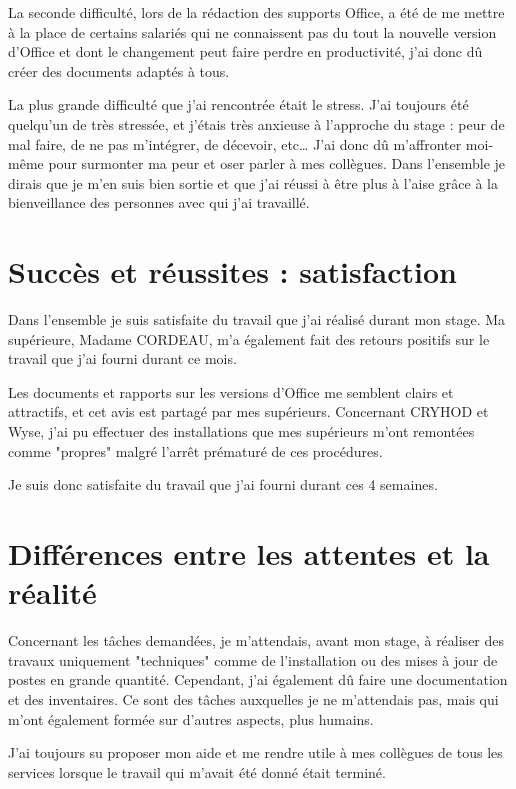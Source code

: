 La seconde difficulté, lors de la rédaction des supports Office, a été de me mettre à la place de certains salariés qui ne connaissent pas du tout la nouvelle version d’Office et dont le changement peut faire perdre en productivité, j’ai donc dû créer des documents adaptés à tous.

La plus grande difficulté que j’ai rencontrée était le stress. J’ai toujours été quelqu’un de très stressée, et j’étais très anxieuse à l’approche du stage : peur de mal faire, de ne pas m’intégrer, de décevoir, etc\dots
J’ai donc dû m’affronter moi-même pour surmonter ma peur et oser parler à mes collègues. Dans l’ensemble je dirais que je m’en suis bien sortie et que j’ai réussi à être plus à l’aise grâce à la bienveillance des personnes avec qui j’ai travaillé.


\section{Succès et réussites : satisfaction}

Dans l'ensemble je suis satisfaite du travail que j'ai réalisé durant mon stage. Ma supérieure, Madame CORDEAU, m'a également fait des retours positifs sur le travail que j'ai fourni durant ce mois.

Les documents et rapports sur les versions d'Office me semblent clairs et attractifs, et cet avis est partagé par mes supérieurs. Concernant CRYHOD et Wyse, j'ai pu effectuer des installations que mes supérieurs m'ont remontées comme "propres" malgré l'arrêt prématuré de ces procédures.

Je suis donc satisfaite du travail que j'ai fourni durant ces 4 semaines.


\section{Différences entre les attentes et la réalité}

Concernant les tâches demandées, je m’attendais, avant mon stage, à réaliser des travaux uniquement "techniques" comme de l’installation ou des mises à jour de postes en grande quantité. Cependant, j’ai également dû faire une documentation et des inventaires. Ce sont des tâches auxquelles je ne m’attendais pas, mais qui m’ont également formée sur d’autres aspects, plus humains.

J’ai toujours su proposer mon aide et me rendre utile à mes collègues de tous les services lorsque le travail qui m’avait été donné était terminé.

